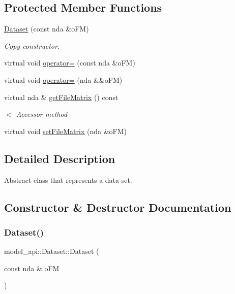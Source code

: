 \subsection*{Protected Member Functions}
\begin{DoxyCompactItemize}
\item 
\hyperlink{classmodel__api_1_1Dataset_aadc165f6e3c76c2a31ebc132cac6e01c}{Dataset} (const nda \&o\+FM)
\begin{DoxyCompactList}\small\item\em Copy constructor. \end{DoxyCompactList}\item 
virtual void \hyperlink{classmodel__api_1_1Dataset_a4000020cf9bc6dd1a55dd40f979f7aea}{operator=} (const nda \&o\+FM)
\item 
virtual void \hyperlink{classmodel__api_1_1Dataset_a48ed0afad3bae183a4615a4de9dba854}{operator=} (nda \&\&o\+FM)
\item 
virtual nda \& \hyperlink{classmodel__api_1_1Dataset_aa2ae7007705796c05e5df64a3d1cda0e}{get\+File\+Matrix} () const
\begin{DoxyCompactList}\small\item\em $<$ Accessor method \end{DoxyCompactList}\item 
virtual void \hyperlink{classmodel__api_1_1Dataset_a50e8c50a3b45cb39cf4403ebfdc1c2dc}{set\+File\+Matrix} (nda \&o\+FM)
\end{DoxyCompactItemize}


\subsection{Detailed Description}
Abstract class that represents a data set. 

\subsection{Constructor \& Destructor Documentation}
\mbox{\label{classmodel__api_1_1Dataset_aadc165f6e3c76c2a31ebc132cac6e01c}} 
\subsubsection{\texorpdfstring{Dataset()}{Dataset()}}
{\footnotesize\ttfamily model\+\_\+api\+::\+Dataset\+::\+Dataset (\begin{DoxyParamCaption}\item[{const nda \&}]{o\+FM }\end{DoxyParamCaption})\hspace{0.3cm}{\ttfamily [protected]}}




